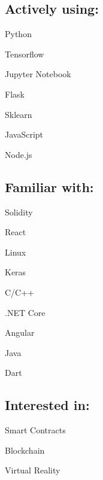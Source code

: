 \documentclass[]{deedy-resume-openfont}
\begin{document}
\begin{minipage}[t]{0.49\textwidth}
\subsection{Actively using:}
\begin{itemize*}
    \item Python
    \item Tensorflow
    \item Jupyter Notebook
    \newline
    \item Flask
    \item Sklearn
    \item JavaScript
    \item Node.js
\end{itemize*}
\sectionsep

\subsection{Familiar with:}
\begin{itemize*}
    \item Solidity
    \item React
    \item Linux
    \item Keras
    \item C/C++
    \newline
    \item .NET Core
    \item Angular
    \item Java
    \item Dart
\end{itemize*}
\sectionsep

\subsection{Interested in:}
\begin{itemize*}
    \item Smart Contracts
    \item Blockchain
    \item Virtual Reality
\end{itemize*}
\sectionsep



\bigskip
\section{ \quad \quad {} }


\end{minipage}
\end{document}
